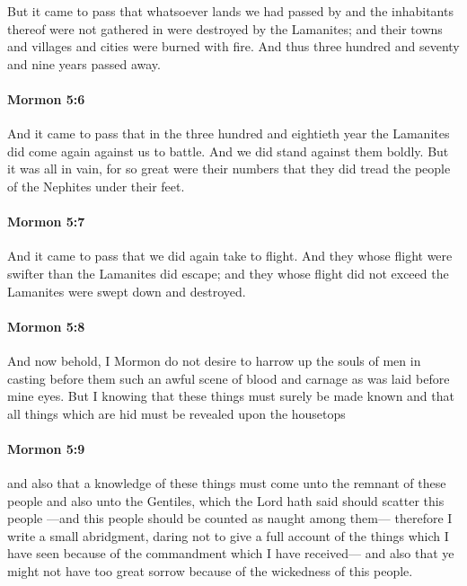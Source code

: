 			But it came to pass that whatsoever lands we had passed by
			and the inhabitants thereof were not gathered in
			were destroyed by the Lamanites;
			and their towns and villages and cities were burned with fire.
			And thus three hundred and seventy and nine years passed away.

		\paragraph{Mormon 5:6} %
			\label{MORMON-5-6}

			And it came to pass that in the three hundred and eightieth year
			the Lamanites did come again against us to battle.
			And we did stand against them boldly.
			But it was all in vain,
			for so great were their numbers
			that they did tread the people of the Nephites under their feet.

		\paragraph{Mormon 5:7} %
			\label{MORMON-5-7}

			And it came to pass that we did again take to flight.
			And they whose flight were swifter than the Lamanites did escape;
			and they whose flight did not exceed the Lamanites
			were swept down and destroyed.

		\paragraph{Mormon 5:8} %
			\label{MORMON-5-8}

			And now behold, I Mormon do not desire to harrow up the souls of men
			in casting before them such an awful scene of blood and carnage
			as was laid before mine eyes.
			But I knowing that these things must surely be made known
			and that all things which are hid must be revealed upon the housetops

		\paragraph{Mormon 5:9} %
			\label{MORMON-5-9}

			and also that a knowledge of these things
			must come unto the remnant of these people and also unto the Gentiles,
			which the Lord hath said should scatter this people
			---and this people should be counted as naught among them---
			therefore I write a small abridgment,
			daring not to give a full account of the things which I have seen
			because of the commandment which I have received---
			and also that ye might not have too great sorrow
			because of the wickedness of this people.

